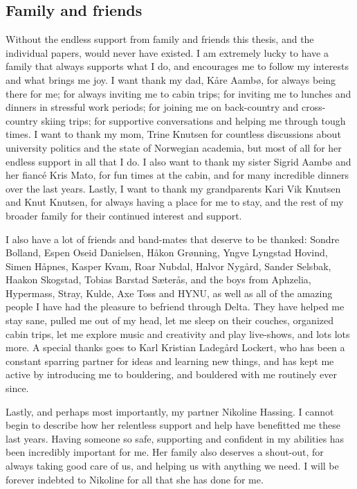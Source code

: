 \subsection*{Family and friends}

Without the endless support from family and friends this thesis, and the individual papers, would never have existed. I am extremely lucky to have a family that always supports what I do, and encourages me to follow my interests and what brings me joy. I want thank my dad, Kåre Aambø, for always being there for me; for always inviting me to cabin trips; for inviting me to lunches and dinners in stressful work periods; for joining me on back-country and cross-country skiing trips; for supportive conversations and helping me through tough times. I want to thank my mom, Trine Knutsen for countless discussions about university politics and the state of Norwegian academia, but most of all for her endless support in all that I do. I also want to thank my sister Sigrid Aambø and her fiancé Kris Mato, for fun times at the cabin, and for many incredible dinners over the last years. Lastly, I want to thank my grandparents Kari Vik Knutsen and Knut Knutsen, for always having a place for me to stay, and the rest of my broader family for their continued interest and support. 

I also have a lot of friends and band-mates that deserve to be thanked: 
Sondre Bolland, 
Espen Oseid Danielsen, 
Håkon Grønning, 
Yngve Lyngstad Hovind, 
Simen Håpnes, 
Kasper Kvam, 
Roar Nubdal, 
Halvor Nygård, 
Sander Selsbak, 
Haakon Skogstad, 
Tobias Barstad Sæterås, 
and the boys from Aphzelia, Hypermass, Stray, Kulde, Axe Toss and HYNU, as well as all of the amazing people I have had the pleasure to befriend through Delta. They have helped me stay sane, pulled me out of my head, let me sleep on their couches, organized cabin trips, let me explore music and creativity and play live-shows, and lots lots more. A special thanks goes to Karl Kristian Ladegård Lockert, who has been a constant sparring partner for ideas and learning new things, and has kept me active by introducing me to bouldering, and bouldered with me routinely ever since. 

Lastly, and perhaps most importantly, my partner Nikoline Hassing. I cannot begin to describe how her relentless support and help have benefitted me these last years. Having someone so safe, supporting and confident in my abilities has been incredibly important for me. Her family also deserves a shout-out, for always taking good care of us, and helping us with anything we need. I will be forever indebted to Nikoline for all that she has done for me. 


\restoregeometry